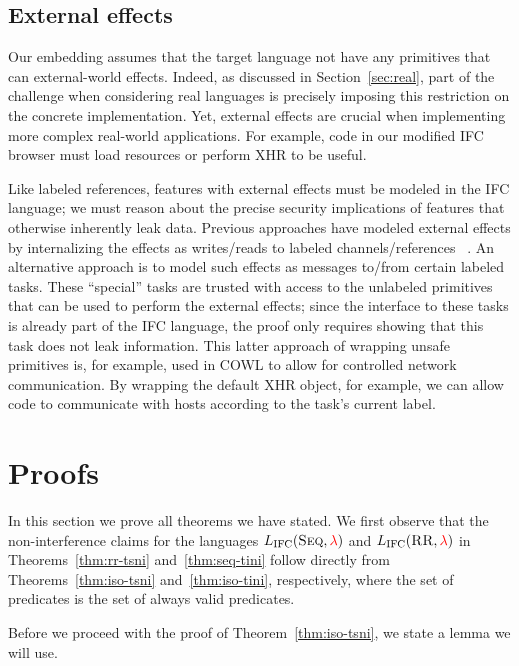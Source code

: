 \documentclass{sigplanconf}
\newcommand{\Red}[1]{{\color{red} #1}}
\newcommand{\tocite}[1]{\Red{\cite{#1}}}
\begin{document}
\subsection{External effects}
\label{sec:extensions:external}
Our embedding assumes that the target language not have any
primitives that can external-world effects.
%
Indeed, as discussed in Section~\ref{sec:real}, part of the challenge
when considering real languages is precisely imposing this restriction
on the concrete implementation.
%
Yet, external effects are crucial when implementing more complex
real-world applications.
%
For example, code in our modified IFC browser must load resources or
perform XHR to be useful.

Like labeled references, features with external effects must be
modeled in the IFC language; we must reason about the precise security
implications of features that otherwise inherently leak data.
%
Previous approaches have modeled external effects by internalizing the
effects as writes/reads to labeled channels/references~\tocite{}.
%
An alternative approach is to model such effects as messages to/from
certain labeled tasks.
%
These ``special'' tasks are trusted with access to the unlabeled
primitives that can be used to perform the external effects; since the
interface to these tasks is already part of the IFC language, the
proof only requires showing that this task does not leak information.
%
This latter approach of wrapping unsafe primitives is, for example,
used in COWL to allow for controlled network communication.
%
By wrapping the default XHR object, for example, we can allow code
to communicate with hosts according to the task's current label.
\section{Proofs}
\label{sec:proofs}

In this section we prove all theorems we have stated.
We first observe that the non-interference claims for the languages
\ensuremath{L_\text{IFC}(\textsc{Seq},\Red{\lambda})} and \ensuremath{L_\text{IFC}(\textsc{RR},\Red{\lambda})}
in Theorems~\ref{thm:rr-tsni} and~\ref{thm:seq-tini} follow directly
from Theorems~\ref{thm:iso-tsni} and~\ref{thm:iso-tini},
respectively, where the set
of predicates is the set of always valid predicates.

Before we proceed with the proof of Theorem~\ref{thm:iso-tsni},
we state a lemma we will use.
\end{document}
